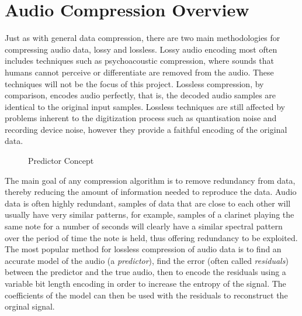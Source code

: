 \documentclass[12pt]{scrartcl}
\begin{document}
  \section{Audio Compression Overview}
  Just as with general data compression, there are two main methodologies for compressing audio data, lossy and lossless. Lossy audio encoding most often includes techniques such as psychoacoustic compression, where sounds that humans cannot perceive or differentiate are removed from the audio. These techniques will not be the focus of this project. Lossless compression, by comparison, encodes audio perfectly, that is, the decoded audio samples are identical to the original input samples. Lossless techniques are still affected by problems inherent to the digitization process such as quantisation noise and recording device noise, however they provide a faithful encoding of the original data.
  
   \begin{figure}[H]
    \caption{Predictor Concept}
    \label{fig:pred_theory}
  \end{figure}
  
  The main goal of any compression algorithm is to remove redundancy from data, thereby reducing the amount of information needed to reproduce the data. Audio data is often highly redundant, samples of data that are close to each other will usually have very similar patterns, for example, samples of a clarinet playing the same note for a number of seconds will clearly have a similar spectral pattern over the period of time the note is held, thus offering redundancy to be exploited. The most popular method for lossless compression of audio data is to find an accurate model of the audio (a \textit{predictor}), find the error (often called \textit{residuals}) between the predictor and the true audio, then to encode the residuals using a variable bit length encoding in order to increase the entropy of the signal. The coefficients of the model can then be used with the residuals to reconstruct the orginal signal.
  
\end{document}
